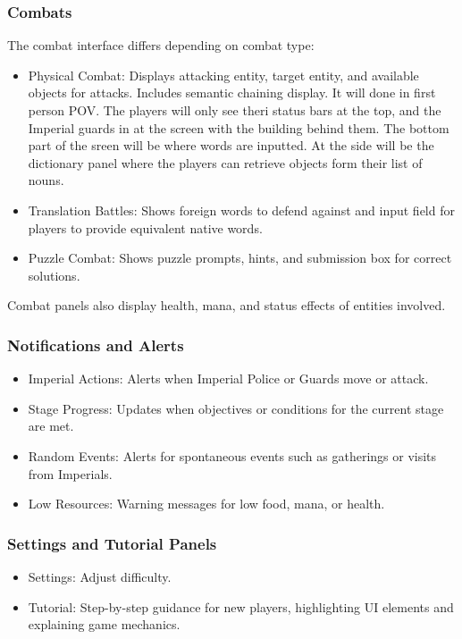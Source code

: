 \documentclass[11pt]{article}
\begin{document}
\subsubsection{Combats}
The combat interface differs depending on combat type:
\begin{itemize}
\item Physical Combat: Displays attacking entity, target entity, and available objects for attacks. Includes semantic chaining display.
  It will done in first person POV. The players will only see theri status bars at the top, and the Imperial guards in at the screen with the building behind them. The bottom part of the sreen will be where words are inputted.  At the side will be the dictionary panel where the players can retrieve objects form their list of nouns.
\item Translation Battles: Shows foreign words to defend against and input field for players to provide equivalent native words.
\item Puzzle Combat: Shows puzzle prompts, hints, and submission box for correct solutions.
\end{itemize}
Combat panels also display health, mana, and status effects of entities involved.

\subsubsection{Notifications and Alerts}
\begin{itemize}
\item Imperial Actions: Alerts when Imperial Police or Guards move or attack.
\item Stage Progress: Updates when objectives or conditions for the current stage are met.
\item Random Events: Alerts for spontaneous events such as gatherings or visits from Imperials.
\item Low Resources: Warning messages for low food, mana, or health.
\end{itemize}

\subsubsection{Settings and Tutorial Panels}
\begin{itemize}
\item Settings: Adjust difficulty.
\item Tutorial: Step-by-step guidance for new players, highlighting UI elements and explaining game mechanics.
\end{itemize}
\end{document}
